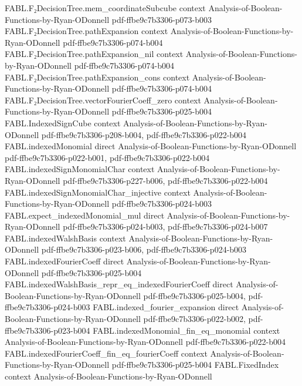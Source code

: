 \begin{theorem}
\proofstep
  {FABL.F₂DecisionTree.mem_coordinateSubcube}
  {context}
  {Analysis-of-Boolean-Functions-by-Ryan-ODonnell}
  {pdf-ffbe9c7b3306-p073-b003}
\proofstep
  {FABL.F₂DecisionTree.pathExpansion}
  {context}
  {Analysis-of-Boolean-Functions-by-Ryan-ODonnell}
  {pdf-ffbe9c7b3306-p074-b004}
\proofstep
  {FABL.F₂DecisionTree.pathExpansion_nil}
  {context}
  {Analysis-of-Boolean-Functions-by-Ryan-ODonnell}
  {pdf-ffbe9c7b3306-p074-b004}
\proofstep
  {FABL.F₂DecisionTree.pathExpansion_cons}
  {context}
  {Analysis-of-Boolean-Functions-by-Ryan-ODonnell}
  {pdf-ffbe9c7b3306-p074-b004}
\proofstep
  {FABL.F₂DecisionTree.vectorFourierCoeff_zero}
  {context}
  {Analysis-of-Boolean-Functions-by-Ryan-ODonnell}
  {pdf-ffbe9c7b3306-p025-b004}
\proofstep
  {FABL.IndexedSignCube}
  {context}
  {Analysis-of-Boolean-Functions-by-Ryan-ODonnell}
  {pdf-ffbe9c7b3306-p208-b004,
    pdf-ffbe9c7b3306-p022-b004}
\proofstep
  {FABL.indexedMonomial}
  {direct}
  {Analysis-of-Boolean-Functions-by-Ryan-ODonnell}
  {pdf-ffbe9c7b3306-p022-b001,
    pdf-ffbe9c7b3306-p022-b004}
\proofstep
  {FABL.indexedSignMonomialChar}
  {context}
  {Analysis-of-Boolean-Functions-by-Ryan-ODonnell}
  {pdf-ffbe9c7b3306-p227-b006,
    pdf-ffbe9c7b3306-p022-b004}
\proofstep
  {FABL.indexedSignMonomialChar_injective}
  {context}
  {Analysis-of-Boolean-Functions-by-Ryan-ODonnell}
  {pdf-ffbe9c7b3306-p024-b003}
\proofstep
  {FABL.expect_indexedMonomial_mul}
  {direct}
  {Analysis-of-Boolean-Functions-by-Ryan-ODonnell}
  {pdf-ffbe9c7b3306-p024-b003,
    pdf-ffbe9c7b3306-p024-b007}
\proofstep
  {FABL.indexedWalshBasis}
  {context}
  {Analysis-of-Boolean-Functions-by-Ryan-ODonnell}
  {pdf-ffbe9c7b3306-p023-b006,
    pdf-ffbe9c7b3306-p024-b003}
\proofstep
  {FABL.indexedFourierCoeff}
  {direct}
  {Analysis-of-Boolean-Functions-by-Ryan-ODonnell}
  {pdf-ffbe9c7b3306-p025-b004}
\proofstep
  {FABL.indexedWalshBasis_repr_eq_indexedFourierCoeff}
  {direct}
  {Analysis-of-Boolean-Functions-by-Ryan-ODonnell}
  {pdf-ffbe9c7b3306-p025-b004,
    pdf-ffbe9c7b3306-p024-b003}
\proofstep
  {FABL.indexed_fourier_expansion}
  {direct}
  {Analysis-of-Boolean-Functions-by-Ryan-ODonnell}
  {pdf-ffbe9c7b3306-p022-b002,
    pdf-ffbe9c7b3306-p023-b004}
\proofstep
  {FABL.indexedMonomial_fin_eq_monomial}
  {context}
  {Analysis-of-Boolean-Functions-by-Ryan-ODonnell}
  {pdf-ffbe9c7b3306-p022-b004}
\proofstep
  {FABL.indexedFourierCoeff_fin_eq_fourierCoeff}
  {context}
  {Analysis-of-Boolean-Functions-by-Ryan-ODonnell}
  {pdf-ffbe9c7b3306-p025-b004}
\proofstep
  {FABL.FixedIndex}
  {context}
  {Analysis-of-Boolean-Functions-by-Ryan-ODonnell}

\end{theorem}

